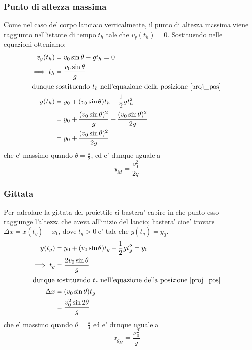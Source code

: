 \subsubsection{Punto di altezza massima}
Come nel caso del corpo lanciato verticalmente, il punto di altezza massima viene raggiunto nell'istante
di tempo $t_h$ tale che $v_y(t_h) = 0$.
Sostituendo nelle equazioni otteniamo:   
\begin{alignat}
    {2}
        v_y(t_h) &= v_0\sin{\theta} - gt_h = 0             \nonumber \\       
    \implies t_h &= \frac{v_0\sin{\theta}}{g}                   \\
    \intertext{dunque sostituendo $t_h$ nell'equazione della posizione \ref{proj_pos}}
    y(t_h)   &= y_0 + (v_0\sin{\theta})t_h - \frac{1}{2}gt_h^2  \nonumber \\
             &= y_0 + \frac{(v_0\sin{\theta})^2}{g} - \frac{(v_0\sin{\theta})^2}{2g} \nonumber \\
             &= y_0 + \frac{(v_0\sin{\theta})^2}{2g}            \label{h_max_proj_theta}
\end{alignat}
che e' massimo quando $\theta = \frac{\pi}{2}$, ed e' dunque uguale a
\begin{equation}
    y_M = \frac{v_0^2}{2g} \label{h_map_proj}
\end{equation}

\subsubsection{Gittata}
Per calcolare la gittata del proiettile ci bastera' capire in che punto esso raggiunge 
l'altezza che aveva all'inizio del lancio;
bastera' cioe' trovare $\Delta x = x(t_g)-x_0$, dove $t_g > 0$ e' tale che $y(t_g) = y_0$.
\begin{alignat}
    {2}
             y(t_g) &= y_0 + (v_0\sin{\theta})t_g - \frac{1}{2}gt_g^2 = y_0 \nonumber \\
    \implies t_g &= \frac{2v_0\sin{\theta}}{g}                   \\
    \intertext{dunque sostituendo $t_g$ nell'equazione della posizione \ref{proj_pos}}
    \Delta x &= (v_0\sin{\theta})t_g  \nonumber \\
             &= \frac{v_0^2\sin{2\theta}}{g}            \label{gittata_proj_theta}
\end{alignat}
che e' massimo quando $\theta = \frac{\pi}{4}$ ed e' dunque uguale a
\begin{equation}
    x_{g_M} = \frac{x_0^2}{g}   \label{gittata_proj}
\end{equation}

